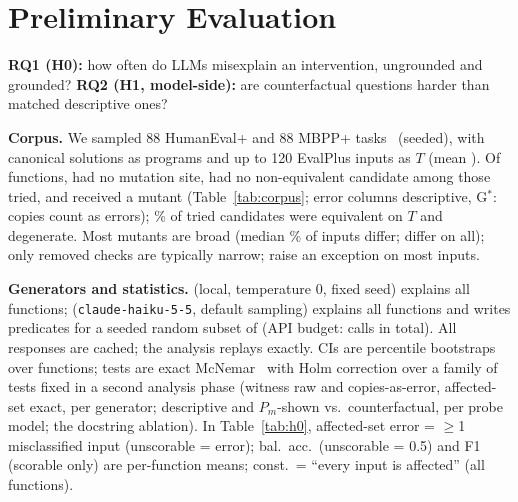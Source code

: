 \section{Preliminary Evaluation}\label{sec:eval}
\textbf{RQ1 (H0):} how often do LLMs misexplain an intervention, ungrounded and grounded?
\textbf{RQ2 (H1, model-side):} are counterfactual questions harder than matched descriptive ones?

\textbf{Corpus.} We sampled 88 HumanEval+ and 88 MBPP+ tasks~\cite{chen2021humaneval,austin2021mbpp,liu2023evalplus}
(seeded), with canonical solutions as programs and up to 120 EvalPlus inputs as $T$ (mean
\SMeanInputsPerFunction). Of \SNFunctionsAttempted{} functions, \SNNoCandidates{} had no mutation site, \SNNoNonequivalent{}
had no non-equivalent candidate among those tried, and \SNMutants{} received a mutant (Table~\ref{tab:corpus}; error columns descriptive, G$^{*}$:
copies count as errors);
\PEquivalentCandidateRate\% of tried candidates were equivalent on $T$ and \SNDegenerate{} degenerate. Most mutants are
broad (median \PzMedianDifferingFraction\% of inputs differ; \SNMutantsAllDiffer{} differ on all); only removed checks are
typically narrow; \SNMutantsRaiseMostly{} raise an exception on most inputs.


\textbf{Generators and statistics.} \GenModel{} (local, temperature 0, fixed seed) explains all functions;
\StrongModel{} (\texttt{claude-haiku-5-5}, default sampling) explains all functions and writes predicates for a seeded
random subset of \SPredStrongN{} (API budget: \SLlmCallsStrong{} calls in total). All \SLlmCacheFiles{} responses are
cached; the analysis replays exactly. CIs are percentile bootstraps over functions; tests are exact
McNemar~\cite{mcnemar1947note} with Holm correction over a family of \SHolmFamilySize{} tests fixed in a second analysis
phase (witness raw and copies-as-error, affected-set exact, per generator; descriptive and $P_m$-shown vs.\ counterfactual,
per probe model; the docstring ablation). In Table~\ref{tab:h0}, affected-set error = $\geq$1 misclassified input
(unscorable = error); bal.\ acc.\ (unscorable = 0.5) and F1 (scorable only) are per-function means; const.\ = ``every
input is affected'' (all functions).


